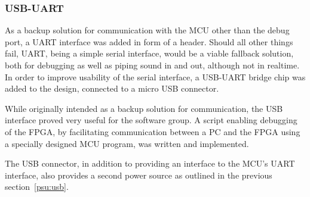 
\subsubsection{USB-UART}

As a backup solution for communication with the MCU other than the debug port,
a UART interface was added in form of a header. Should all other things fail,
UART, being a simple serial interface, would be a viable fallback solution, both
for debugging as well as piping sound in and out, although not in realtime. In
order to improve usability of the serial interface, a USB-UART bridge chip was
added to the design, connected to a micro USB connector.

While originally intended as a backup solution for communication, the USB
interface proved very useful for the software group. A script enabling debugging
of the FPGA, by facilitating communication between a PC and the FPGA using a
specially designed MCU program, was written and implemented. 

The USB connector, in addition to providing an interface to the MCU's UART
interface, also provides a second power source as outlined in
the previous section~\ref{psu:usb}.
